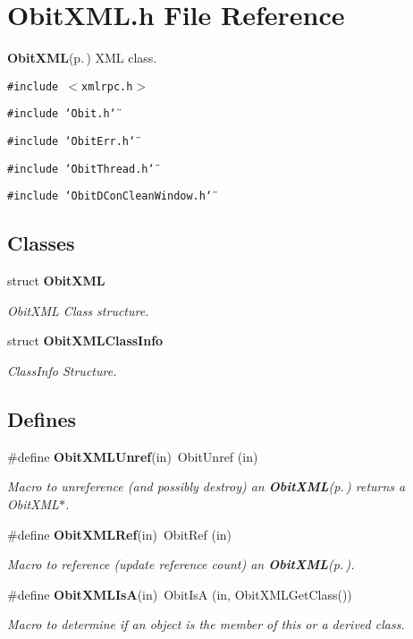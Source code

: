 \section{Obit\-XML.h File Reference}
\label{ObitXML_8h}
{\bf Obit\-XML}{\rm (p.\,\pageref{structObitXML})} XML class. 

{\tt \#include $<$xmlrpc.h$>$}\par
{\tt \#include \char`\"{}Obit.h\char`\"{}}\par
{\tt \#include \char`\"{}Obit\-Err.h\char`\"{}}\par
{\tt \#include \char`\"{}Obit\-Thread.h\char`\"{}}\par
{\tt \#include \char`\"{}Obit\-DCon\-Clean\-Window.h\char`\"{}}\par
\subsection*{Classes}
\begin{CompactItemize}
\item 
struct {\bf Obit\-XML}
\begin{CompactList}\small\item\em Obit\-XML Class structure. \item\end{CompactList}\item 
struct {\bf Obit\-XMLClass\-Info}
\begin{CompactList}\small\item\em Class\-Info Structure. \item\end{CompactList}\end{CompactItemize}
\subsection*{Defines}
\begin{CompactItemize}
\item 
\#define {\bf Obit\-XMLUnref}(in)\ Obit\-Unref (in)
\begin{CompactList}\small\item\em Macro to unreference (and possibly destroy) an {\bf Obit\-XML}{\rm (p.\,\pageref{structObitXML})} returns a Obit\-XML$\ast$. \item\end{CompactList}\item 
\#define {\bf Obit\-XMLRef}(in)\ Obit\-Ref (in)
\begin{CompactList}\small\item\em Macro to reference (update reference count) an {\bf Obit\-XML}{\rm (p.\,\pageref{structObitXML})}. \item\end{CompactList}\item 
\#define {\bf Obit\-XMLIs\-A}(in)\ Obit\-Is\-A (in, Obit\-XMLGet\-Class())
\begin{CompactList}\small\item\em Macro to determine if an object is the member of this or a derived class. \item\end{CompactList}\end{CompactItemize}
